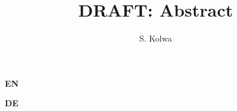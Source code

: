\documentclass[10pt,a4paper]{article}
\begin{document}
\title{{\bf DRAFT:} Abstract}
\author{S. Kolwa}
\maketitle


{\bf EN}



{\bf DE}
\end{document}
